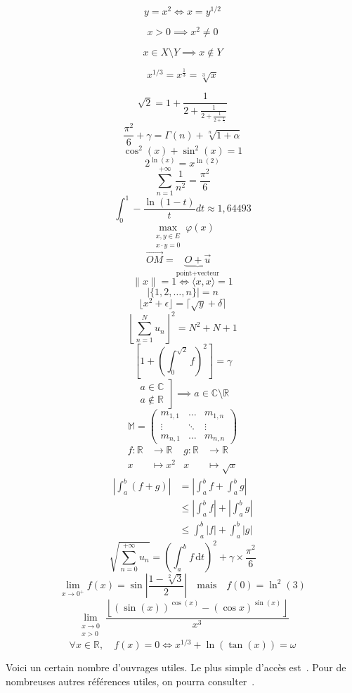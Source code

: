 \documentclass[a4paper,10pt]{scrartcl}
\newcommand{\R}{\mathbb{R}}
\newcommand{\abs}[1]{\left\lvert#1\right\rvert}
\begin{document}
\[
    y=x^2 \iff x=y^{1/2}
    \]

\[
    x>0 \implies x^2\neq0
    \]

\[
    x\in X\setminus Y \implies x \not\in Y
    \]

\[
    x^{1/3} = x^{\frac{1}{3}} = \sqrt[3]{x}
    \]

\[
    \sqrt{2} = 1 + \frac{1}{2+\frac{1}{2+\frac{1}{2+\frac{1}{\ddots}}}}
    \]
\[
    \frac{\pi^2}{6} + \gamma = \Gamma(n) + \sqrt[n]{1+\alpha}
    \]
\[
    \cos^2(x) + \sin^2(x) = 1
    \]
\[
    2^{\ln(x)} = x^{\ln(2)}
    \]
\[
    \sum_{n=1}^{+\infty} \frac{1}{n^2} = \frac{\pi^2}{6}
    \]
\[
    \int_0^1 -\frac{\ln(1-t)}{t} dt \approx 1{,}64493
    \]
\[
    \max_{  \substack{x,y \in E \\ x \cdot y = 0}  } \varphi(x)
    \]
\[
    \overrightarrow{OM}
    =
    \underbrace{O + \vec{u}}_{\text{point}+\text{vecteur}}
    \]
\[
    \lVert x \rVert = 1 \iff \langle x, x \rangle = 1
    \]
\[
    \lvert\{1, 2, \dots, n\}\rvert = n
    \]
\[
    \lfloor x^2+\epsilon \rfloor = \lceil \sqrt{y}+\delta \rceil
    \]
\[
    \left\lfloor\sum_{n=1}^{N}{u_n}\right\rfloor^2 = N^2+N+1
    \]
\[
    \left[1+\left(\int_0^{\sqrt{2}} f\right)^2\right] = \gamma
    \]
\[
    \left.
    \begin{array}{r}
    a\in\mathbb{C}\\
    a\not\in\mathbb{R}
    \end{array}
    \right]
    \implies
    a\in\mathbb{C}\setminus\mathbb{R}
    \]
\[
    \mathbb{M} =
    \begin{pmatrix}
    m_{1,1} & \dots     & m_{1,n} \\
    \vdots  & \ddots    & \vdots \\
    m_{n,1} & \dots     & m_{n,n}
    \end{pmatrix}
    \]
\begin{align*}
    f\colon \R  & \to \R        & g\colon \R & \to \R \\
    x           & \mapsto x^2   & x          & \mapsto \sqrt{x}
    \end{align*}
\begin{align*}
    \abs{\int_{a}^{b}{(f+g)}}
        & =    \abs{\int_{a}^{b}{f}  + \int_{a}^{b}{g}}      \\
        & \leq \abs{\int_{a}^{b}{f}} + \abs{\int_{a}^{b}{g}} \\
        & \leq \int_{a}^{b}{\abs{f}} + \int_{a}^{b}{\abs{g}}
    \end{align*}
\[
    \sqrt{\sum_{n=0}^{+\infty} u_n}
    =
    \left(\int_a^b f \,\mathrm{d}t\right)^2 + \gamma \times \frac{\pi^2}{6}
    \]
\[
    \lim_{x \to 0^+} f(x) = \sin \left|\frac{1-\sqrt[2]{3}}{2}\right|
    \quad \text{mais} \quad f(0) = \ln^2 (3)
    \]
\[
    \lim_{\substack{x \to 0 \\ x > 0}}
    \frac{ \left\lfloor(\sin (x))^{\cos (x)}-(\cos x)^{\sin (x)}\right\rfloor }{x^3}
    \]
\[
    \forall x \in \mathbb{R}, \quad f(x) = 0 \iff x^{1/3} + \ln(\tan(x)) = \omega
    \]

Voici un certain nombre d'ouvrages utiles. Le plus simple d'accès est~\cite{lcfr}.
Pour de nombreuses autres références utiles, on pourra consulter~\cite[p.~3]{El03}.


\end{document}
